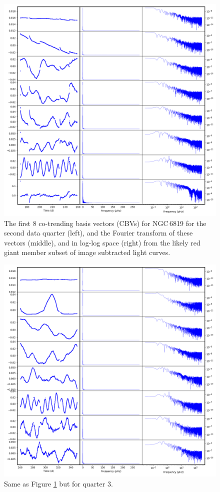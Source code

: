 \begin{figure}
    \centering
    \includegraphics[width=\linewidth]{Chapter_Appended/AppB/cbv_6819_rgs_q02.png}
    \caption{The first 8 co-trending basis vectors (CBVs) for NGC\,6819 for the second data quarter (left), and the Fourier transform of these vectors (middle), and in log-log space (right) from the likely red giant member subset of image subtracted light curves.}
    \label{fig:cbvs_rgsIS_6819_Q2}
\end{figure}


\begin{figure}
    \centering
    \includegraphics[width=\linewidth]{Chapter_Appended/AppB/cbv_6819_rgs_q03.png}
    \caption{Same as Figure \ref{fig:cbvs_rgsIS_6819_Q2} but for quarter 3.}
    \label{fig:cbvs_rgsIS_6819_Q03}
\end{figure}



